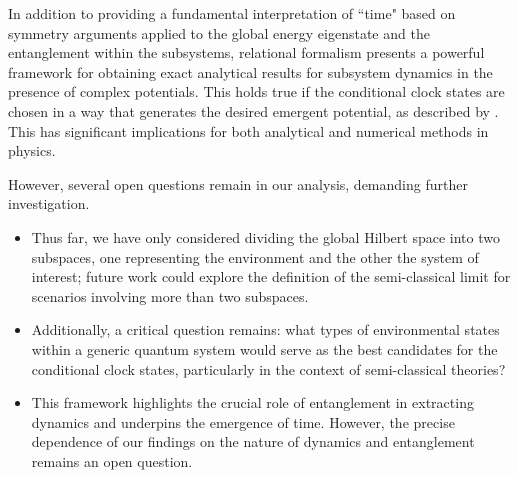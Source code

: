 In addition to providing a fundamental interpretation of ``time" based on symmetry arguments applied to the global energy eigenstate and the entanglement within the subsystems, relational formalism presents a powerful framework for obtaining exact analytical results for subsystem dynamics in the presence of complex potentials. This holds true if the conditional clock states are chosen in a way that generates the desired emergent potential, as described by . This has significant implications for both analytical and numerical methods in physics.

However, several open questions remain in our analysis, demanding further investigation. 
\begin{itemize}
    \item Thus far, we have only considered dividing the global Hilbert space into two subspaces, one representing the environment and the other the system of interest; future work could explore the definition of the semi-classical limit for scenarios involving more than two subspaces. 
    \item Additionally, a critical question remains: what types of environmental states within a generic quantum system would serve as the best candidates for the conditional clock states, particularly in the context of semi-classical theories? 
    \item  This framework highlights the crucial role of entanglement in extracting dynamics and underpins the emergence of time. However, the precise dependence of our findings on the nature of dynamics and entanglement remains an open question.
\end{itemize}
